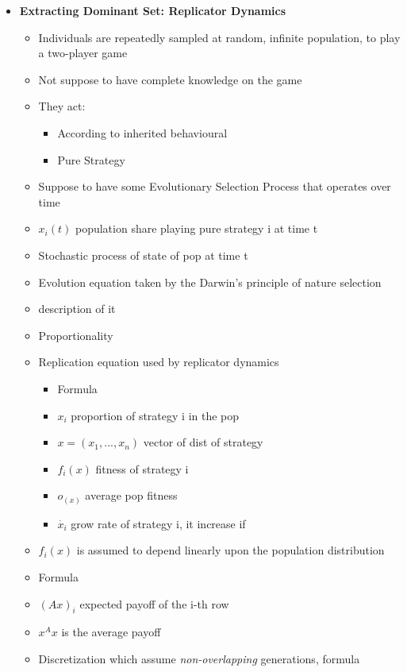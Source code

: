 \begin{itemize}
\begin{itemize}
    \end{itemize}
    \item \textbf{Extracting Dominant Set: Replicator Dynamics}
    \begin{itemize}
        \item Individuals are repeatedly sampled at random, infinite population, to play a two-player game
        \item Not suppose to have complete knowledge on the game
        \item They act:
        \begin{itemize}
            \item According to inherited behavioural
            \item Pure Strategy
        \end{itemize}
        \item Suppose to have some Evolutionary Selection Process that operates over time
        \item \(x_i(t)\) population share playing pure strategy i at time t
        \item Stochastic process of state of pop at time t
        \item Evolution equation taken by the Darwin's principle of nature selection
        \item description of it
        \item Proportionality 
        \item Replication equation used by replicator dynamics
        \begin{itemize}
            \item Formula
            \item \(x_i\) proportion of strategy i in the pop
            \item \(x = (x_1,..., x_n)\) vector of dist of strategy
            \item \(f_i(x)\) fitness of strategy i
            \item \(o_(x)\) average pop fitness
            \item \(\dot{x_i}\) grow rate of strategy i, it increase if
        \end{itemize}
        \item \(f_i(x)\) is assumed to depend linearly upon the population distribution
        \item Formula
        \item \((Ax)_i\) expected payoff of the i-th row
        \item \(x^Ax\) is the average payoff
        \item Discretization which assume \textit{non-overlapping} generations, formula
    \end{itemize}
\end{itemize}
